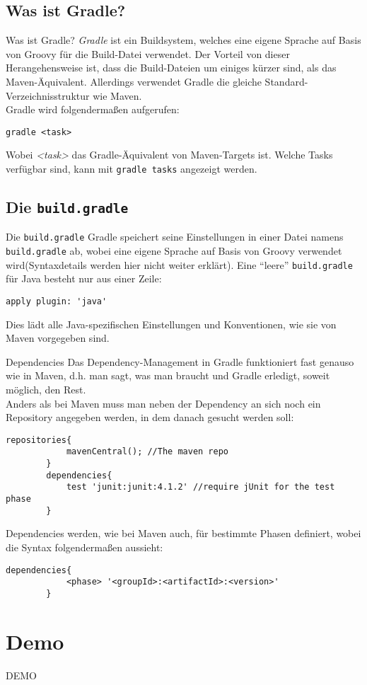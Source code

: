 \subsection{Was ist Gradle?}
\begin{frame}[fragile]{Was ist Gradle?}
    \onslide<+->
    \textit{Gradle} ist ein Buildsystem, welches eine eigene Sprache auf Basis von Groovy für die Build-Datei verwendet.
    Der Vorteil von dieser Herangehensweise ist, dass die Build-Dateien um einiges kürzer sind, als das Maven-Äquivalent.
    Allerdings verwendet Gradle die gleiche Standard-Verzeichnisstruktur wie Maven.\\
    \onslide<+->
    Gradle wird folgendermaßen aufgerufen:
    \begin{lstlisting}[gobble=8]
        gradle <task>
    \end{lstlisting}
    Wobei \textit{<task>} das Gradle-Äquivalent von Maven-Targets ist. Welche Tasks verfügbar sind, kann mit \texttt{gradle tasks} angezeigt werden.
\end{frame}

\subsection{Die \texttt{build.gradle}}
\begin{frame}[fragile]{Die \texttt{build.gradle}}
    \onslide<+->
    Gradle speichert seine Einstellungen in einer Datei namens \texttt{build.gradle} ab, wobei eine eigene Sprache auf Basis von Groovy verwendet wird(Syntaxdetails werden hier nicht weiter erklärt).
    \onslide<+->
    Eine \enquote{leere} \texttt{build.gradle} für Java besteht nur aus einer Zeile:
    \begin{lstlisting}[gobble=8]
        apply plugin: 'java'
    \end{lstlisting}
    \onslide<+->
    Dies lädt alle Java-spezifischen Einstellungen und Konventionen, wie sie von Maven vorgegeben sind.
\end{frame}

\begin{frame}[fragile]{Dependencies}
    \onslide<+->
    Das Dependency-Management in Gradle funktioniert fast genauso wie in Maven, d.h. man sagt, was man braucht und Gradle erledigt, soweit möglich, den Rest.\\
    \onslide<+->
    Anders als bei Maven muss man neben der Dependency an sich noch ein Repository angegeben werden, in dem danach gesucht werden soll:
    \begin{lstlisting}[gobble=8]
        repositories{
            mavenCentral(); //The maven repo
        }
        dependencies{
            test 'junit:junit:4.1.2' //require jUnit for the test phase
        }
    \end{lstlisting}
    \onslide<+->
    Dependencies werden, wie bei Maven auch, für bestimmte Phasen definiert, wobei die Syntax folgendermaßen aussieht:
    \begin{lstlisting}[gobble=8]
        dependencies{
            <phase> '<groupId>:<artifactId>:<version>'
        }
    \end{lstlisting}
\end{frame}

\section{Demo}
\begin{frame}
    \center\huge{DEMO}
\end{frame}


